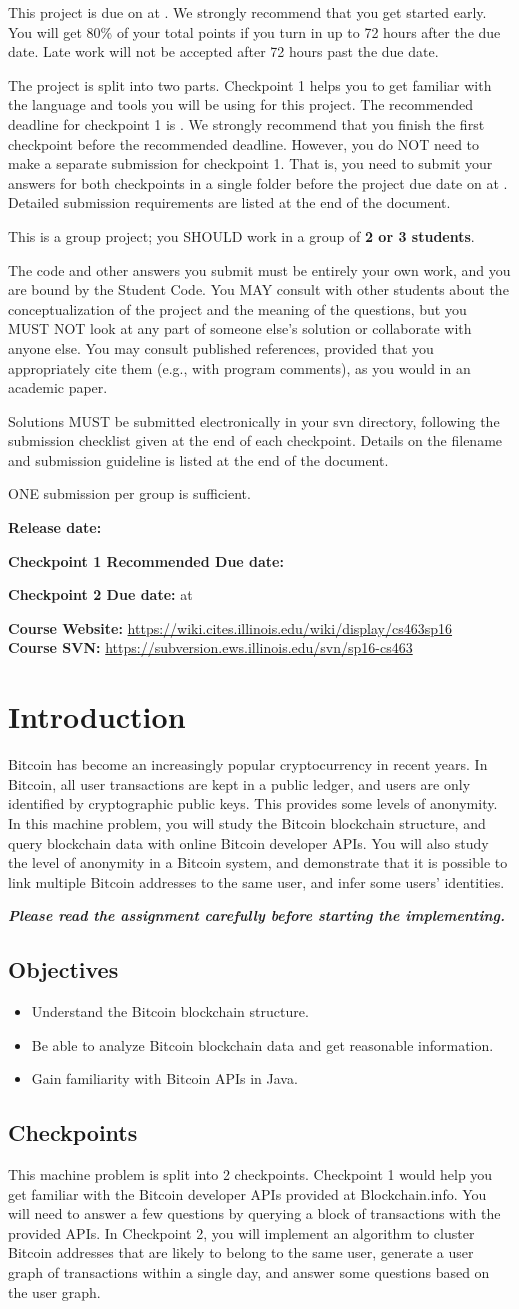 \documentclass[letterpaper,12pt]{report}
\newcommand{\htitle}
{
     \noindent\parbox{\textwidth}
    {
        \course\hfill \distdate\newline
        \coursename\hfill 
        \settitle \vspace*{-.5ex}\newline
        \mbox{}\hrulefill\mbox{}
    }
    \vspace{8pt}
    \begin{center}{\Large\bf{\settitle}}\end{center}
}
\newcommand{\handout}
{
    \thispagestyle{empty}
    \markboth{}{}
    \pagestyle{plain}
    \htitle
}
\newcommand{\problemsetheader}
{
\setlength{\parindent}{0pt}

\medskip

This project is due on \textbf{\duedateTwo} at \textbf{\duetime}. We strongly recommend that you get started early. You will get 80\% of your total points if you turn in up to 72 hours after the due date. Late work will not be accepted after 72 hours past the due date.

\medskip

The project is split into two parts. Checkpoint 1 helps you to get familiar with the language and tools you will be using for this project. The recommended deadline for checkpoint 1 is \textbf{\duedateOne}. We strongly recommend that you finish the first checkpoint before the recommended deadline. However, you do NOT need to make a separate submission for checkpoint 1. That is, you need to submit your answers for both checkpoints in a single folder before the project due date on \textbf{\duedateTwo} at \textbf{\duetime}. Detailed submission requirements are listed at the end of the document.

\medskip

This is a group project; you SHOULD work in a group of {\bf 2 or 3 students}. 

\medskip

The code and other answers you submit must be entirely your own work, and you are bound
by the Student Code. You MAY consult with other students about the conceptualization of the
project and the meaning of the questions, but you MUST NOT look at any part of someone else's
solution or collaborate with anyone else. You may consult published references,
provided that you appropriately cite them (e.g., with program comments), as you would in an
academic paper.

\medskip

Solutions MUST be submitted electronically in your svn directory,
following the submission checklist given at the end of each checkpoint. Details on the filename and
submission guideline is listed at the end of the document. 

\medskip

ONE submission per group is sufficient. 

\medskip

{\noindent \textbf{Release date:} \distdate }

{\noindent \textbf{Checkpoint 1 Recommended Due date:} \duedateOne}

{\noindent \textbf{Checkpoint 2 Due date:} {\duedateTwo} at \duetime}

\medskip

{\noindent \textbf{Course Website:} \url{https://wiki.cites.illinois.edu/wiki/display/cs463sp16}\\}
{\noindent \textbf{Course SVN:} \url{https://subversion.ews.illinois.edu/svn/sp16-cs463}}

\medskip

\hrulefill
}
\begin{document}
\handout

\problemsetheader


\pagebreak
\section*{Introduction}

Bitcoin has become an increasingly popular cryptocurrency in recent years. In Bitcoin, all user transactions are kept in a public ledger, and users are only identified by cryptographic public keys. This provides some levels of anonymity. In this machine problem, you will study the Bitcoin blockchain structure, and query blockchain data with online Bitcoin developer APIs. You will also study the level of anonymity in a Bitcoin system, and demonstrate that it is possible to link multiple Bitcoin addresses to the same user, and infer some users' identities. 

\medskip

\textbf{\centering\emph{Please read the assignment carefully before starting the implementing.}}

\subsection*{Objectives}
\begin{itemize}
\item Understand the Bitcoin blockchain structure. 
\item Be able to analyze Bitcoin blockchain data and get reasonable information.  
\item Gain familiarity with Bitcoin APIs in Java.
\end{itemize}
\subsection*{Checkpoints}

This machine problem is split into 2 checkpoints. Checkpoint 1 would help you get familiar with the Bitcoin developer APIs provided at Blockchain.info. You will need to answer a few questions by querying a block of transactions with the provided APIs. In Checkpoint 2, you will implement an algorithm to cluster Bitcoin addresses that are likely to belong to the same user, generate a user graph of transactions within a single day, and answer some questions based on the user graph.  
\end{document}
